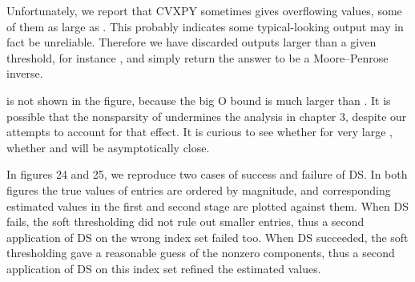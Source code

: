 Unfortunately, we report that CVXPY sometimes gives overflowing values, some of them as large as .
This probably indicates some typical-looking output may in fact be unreliable.
Therefore we have discarded outputs larger than a given threshold, for instance , and simply return the answer to be a Moore–Penrose inverse.

\m {\tilde {\chi}} is not shown in the figure, because the big O bound is much larger than \m {\chi}.
It is possible that the nonsparsity of  undermines the analysis in chapter 3, despite our attempts to account for that effect.
It is curious to see whether for very large , whether \m {\tilde {\chi}} and \m {\tilde {\chi}} will be asymptotically close.

In figures 24 and 25, we reproduce two cases of success and failure of DS.
In both figures the true values of  entries are ordered by magnitude, and corresponding estimated values in the first and second stage are plotted against them.
When DS fails, the soft thresholding did not rule out smaller entries, thus a second application of DS on the wrong index set failed too.
When DS succeeded, the soft thresholding gave a reasonable guess of the nonzero components, thus a second application of DS on this index set refined the estimated values.


